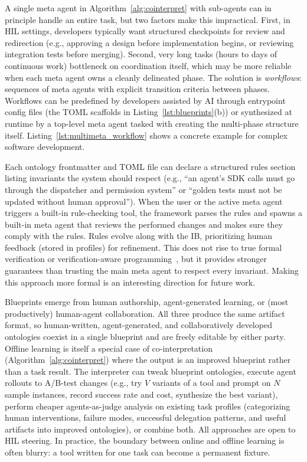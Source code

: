 \label{sec:workflows}
A single meta agent in Algorithm~\ref{alg:cointerpret} with sub-agents can in principle handle an entire task, but two factors make this impractical.
First, in HIL settings, developers typically want structured checkpoints for review and redirection (e.g., approving a design before implementation begins, or reviewing integration tests before merging).
Second, very long tasks (hours to days of continuous work) bottleneck on coordination itself, which may be more reliable when each meta agent owns a cleanly delineated phase.
The solution is \emph{workflows}: sequences of meta agents with explicit transition criteria between phases.
Workflows can be predefined by developers assisted by AI through entrypoint config files (the TOML scaffolds in Listing~\ref{lst:blueprints}(b)) or synthesized at runtime by a top-level meta agent tasked with creating the multi-phase structure itself. Listing~\ref{lst:multimeta_workflow} shows a concrete example for complex software development.

\label{sec:semiformal}
Each ontology frontmatter and TOML file can declare a structured rules section listing invariants the system should respect (e.g., ``an agent's SDK calls must go through the dispatcher and permission system'' or ``golden tests must not be updated without human approval''). When the user or the active meta agent triggers a built-in rule-checking tool, the framework parses the rules and spawns a built-in meta agent that reviews the performed changes and makes sure they comply with the rules. Rules evolve along with the IB, prioritizing human feedback (stored in profiles) for refinement. This does not rise to true formal verification or verification-aware programming~\cite{bertot2004coq,leino2010dafny}, but it provides stronger guarantees than trusting the main meta agent to respect every invariant. Making this approach more formal is an interesting direction for future work.

Blueprints emerge from human authorship, agent-generated learning, or (most productively) human-agent collaboration. All three produce the same artifact format, so human-written, agent-generated, and collaboratively developed ontologies coexist in a single blueprint and are freely editable by either party.
Offline learning is itself a special case of co-interpretation (Algorithm~\ref{alg:cointerpret}) where the output is an improved blueprint rather than a task result.
The interpreter can tweak blueprint ontologies, execute agent rollouts to A/B-test changes (e.g., try $V$ variants of a tool and prompt on $N$ sample instances, record success rate and cost, synthesize the best variant), perform cheaper agents-as-judge analysis on existing task profiles (categorizing human interventions, failure modes, successful delegation patterns, and useful artifacts into improved ontologies), or combine both.
All approaches are open to HIL steering.
In practice, the boundary between online and offline learning is often blurry: a tool written for one task can become a permanent fixture.
